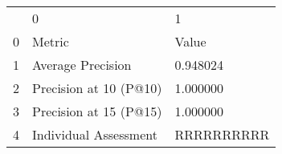 \begin{tabular}{lll}
 & 0 & 1 \\
0 & Metric & Value \\
1 & Average Precision & 0.948024 \\
2 & Precision at 10 (P@10) & 1.000000 \\
3 & Precision at 15 (P@15) & 1.000000 \\
4 & Individual Assessment & RRRRRRRRRR \\
\end{tabular}
